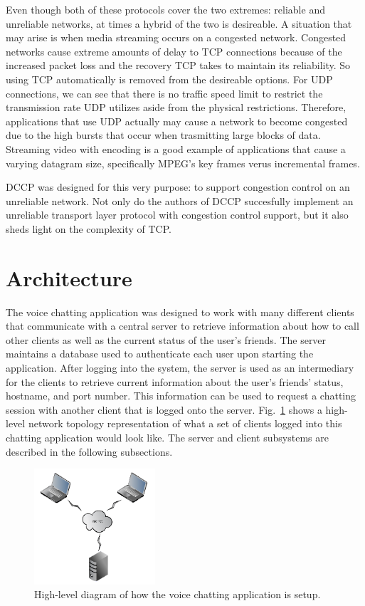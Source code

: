 \documentclass[letterpaper, 9 pt, balance, conference]{ieeeconf}
\begin{document}
Even though both of these protocols cover the two extremes: reliable and unreliable
networks, at times a hybrid of the two is desireable.  A situation
that may arise is when media streaming occurs on a congested network. 
Congested networks cause extreme amounts of delay to TCP connections because of
the increased packet loss and the recovery TCP takes to maintain its reliability. 
So using TCP automatically is removed from the desireable options.  For
UDP connections, we can see that there is no traffic speed limit to restrict the
transmission rate UDP utilizes aside from the physical restrictions.  Therefore, 
applications that use UDP actually
may cause a network to become congested due to the high bursts that occur when
trasmitting large blocks of data.  Streaming video with encoding is a good example 
of applications that cause a varying datagram size, specifically MPEG's key frames
verus incremental frames.

DCCP was designed for this very purpose: to support congestion control on an 
unreliable network.  Not only do the authors of DCCP succesfully implement an 
unreliable transport layer protocol with congestion control support, but it also 
sheds light on the complexity of TCP.

\section{Architecture}
\label{sec:architec}

The voice chatting application was designed to work with many different clients
that communicate with a central server to retrieve information about how to call
other clients as well as the current status of the user's friends. The server 
maintains a database used to authenticate each user upon starting the application.
After logging into the system, the server is used as an intermediary for the clients
to retrieve current information about the user's friends' status, hostname, and
port number. This information can be used to request a chatting session with another
client that is logged onto the server.  Fig.~\ref{fig:setup} shows a high-level
network topology representation of what a set of clients logged into this chatting 
application would look like.  The server and client subsystems are described in
the following subsections.

\begin{figure}[h]
   \centering
      \includegraphics[width=0.4\textwidth]{pics/setup}
   \caption{High-level diagram of how the voice chatting application is setup.}
\label{fig:setup}
\end{figure}
\end{document}
